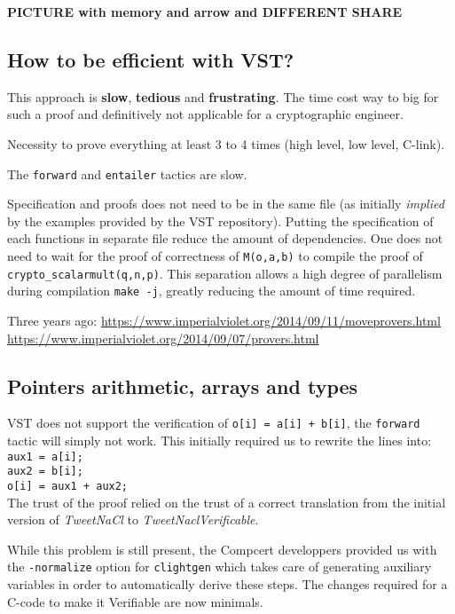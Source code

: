 \textbf{PICTURE with memory and arrow and DIFFERENT SHARE}

\subsection{How to be efficient with VST?}

This approach is \textbf{slow}, \textbf{tedious} and \textbf{frustrating}.
The time cost way to big for such a proof and definitively not applicable for a
cryptographic engineer.

Necessity to prove everything at least 3 to 4 times (high level, low level, C-link).

The \texttt{forward} and \texttt{entailer} tactics are slow.

Specification and proofs does not need to be in the same file (as initially \textit{implied}
by the examples provided by the VST repository). Putting the specification of each
functions in separate file reduce the amount of dependencies. One does not need
to wait for the proof of correctness of \texttt{M(o,a,b)} to compile the proof of \texttt{crypto\_scalarmult(q,n,p)}.
This separation allows a high degree of parallelism during compilation \texttt{make -j},
greatly reducing the amount of time required.

Three years ago:
\url{https://www.imperialviolet.org/2014/09/11/moveprovers.html}
\url{https://www.imperialviolet.org/2014/09/07/provers.html}

\subsection{Pointers arithmetic, arrays and types}

VST does not support the verification of \texttt{o[i] = a[i] + b[i]},
the \texttt{forward} tactic will simply not work. This initially required us to
rewrite the lines into:\\
\texttt{aux1 = a[i];\\
aux2 = b[i];\\
o[i] = aux1 + aux2;}\\
The trust of the proof relied on the trust of a correct translation from the
initial version of \textit{TweetNaCl} to \textit{TweetNaclVerificable}.

While this problem is still present, the Compcert developpers provided us with
the \texttt{-normalize} option for \texttt{clightgen} which takes care of
generating auxiliary variables in order to automatically derive these steps.
The changes required for a C-code to make it Verifiable are now minimals.

